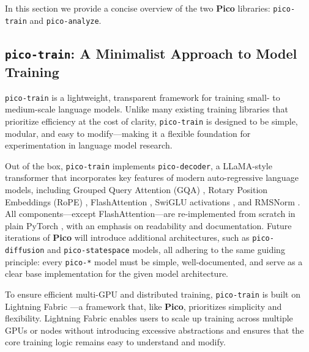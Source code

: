 \section{\picolarge}

In this section we provide a concise overview of the two \textbf{Pico} libraries: \texttt{pico-train} and \texttt{pico-analyze}. 


\subsection{\texttt{pico-train}: A Minimalist Approach to Model Training}

\texttt{pico-train} is a lightweight, transparent framework for training small- to medium-scale language models. Unlike many existing training libraries that prioritize efficiency at the cost of clarity, \texttt{pico-train} is designed to be simple, modular, and easy to modify—making it a flexible foundation for experimentation in language model research.

Out of the box, \texttt{pico-train} implements \texttt{pico-decoder}, a LLaMA-style transformer \citep{touvron2023llama} that incorporates key features of modern auto-regressive language models, including Grouped Query Attention (GQA) \citep{ainslie2023gqa}, Rotary Position Embeddings (RoPE) \citep{su2024rope}, FlashAttention \citep{dao2022flashattention}, SwiGLU activations \citep{shazeer2020glu}, and RMSNorm \citep{zhang2019rmsnorm}. All components—except FlashAttention—are re-implemented from scratch in plain PyTorch \citep{paszke2017pytorch}, with an emphasis on readability and documentation. Future iterations of \textbf{Pico} will introduce additional architectures, such as \texttt{pico-diffusion} and \texttt{pico-statespace} models, all adhering to the same guiding principle: every \texttt{pico-*} model must be simple, well-documented, and serve as a clear base implementation for the given model architecture.

To ensure efficient multi-GPU and distributed training, \texttt{pico-train} is built on Lightning Fabric \citep{lightning-fabric}—a framework that, like \textbf{Pico}, prioritizes simplicity and flexibility. Lightning Fabric enables users to scale up training across multiple GPUs or nodes without introducing excessive abstractions and ensures that the core training logic remains easy to understand and modify.

